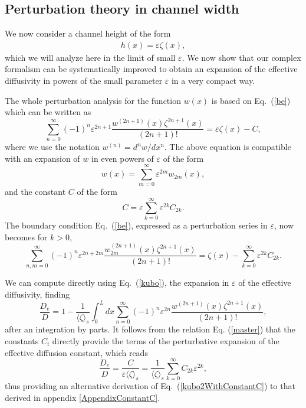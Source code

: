 \documentclass[pre,showpacs,preprintnumbers,amsmath,amssymb,superscriptaddress]{revtex4-1}
\begin{document}
{{\subsection{Perturbation theory in channel width}\label{pert}

We now consider a channel height of the form 
\begin{align}
h(x) = \varepsilon\zeta(x), 
\end{align}
which we will analyze here in the limit of small $\varepsilon$.
We now show that our complex formalism can be systematically improved to obtain an expansion of the effective diffusivity in powers of the small parameter $\varepsilon$ in a very compact way.
 
The whole perturbation analysis for the function $w(x)$ is based on Eq.~(\ref{be}) which can be written as
\begin{equation}
\sum_{n=0}^\infty(-1)^n\varepsilon^{2n+1}\frac{ w^{(2n+1)}(x) \zeta^{2n+1} (x)}{(2n+1)!} = {\varepsilon \zeta(x)-C},\label{master}
\end{equation} 
where we use the notation $w^{(n)} = d^n w /dx^n$. The above equation is compatible with an expansion of $w$ in even powers of $\varepsilon$ of the form
\begin{equation}
w(x) = \sum_{m=0}^\infty \varepsilon^{2m}w_{2m}(x),
\end{equation}
and the constant $C$ of the form
\begin{equation}
C= \varepsilon \sum_{k=0}^\infty \varepsilon^{2k}C_{2k} .
\end{equation}
The boundary condition Eq.~(\ref{be}), expressed as a perturbation series in $\varepsilon$, now becomes for $k>0$,
\begin{equation}
\sum_{n,m=0}^\infty(-1)^n\varepsilon^{2n+2m}\frac{ w_{2m}^{(2n+1)}(x) \zeta^{2n+1} (x)}{(2n+1)!} = { \zeta(x)-\sum_{k=0}^\infty \varepsilon^{2k}C_{2k} }.\label{perta}
\end{equation}

We can compute directly using  Eq.~(\ref{kubo}), the expansion in $\varepsilon$ of the effective diffusivity, finding
\begin{equation}
\frac{D_e}{D} =1 - \frac{1}{\langle \zeta\rangle_s}\int_0^L d{x} \sum_{n=0}^\infty (-1)^n \varepsilon^{2n}\frac{w^{(2n+1)}(x)\zeta^{2n+1}(x)}{(2n+1)!},
\end{equation}
after an integration by parts. It follows from the relation Eq. (\ref{master}) that the constants $C_i$ directly provide the terms of the perturbative expansion of the effective diffusion constant, which reads
\begin{equation}
\frac{D_e}{D} =\frac{C}{\varepsilon\langle \zeta\rangle_s} = \frac{1}{\langle \zeta\rangle_s} \sum_{k=0}^\infty C_{2k} \varepsilon^{2k} \label{De},
\end{equation}
thus providing an alternative derivation of Eq.~(\ref{kubo2WithConstantC}) to that derived in appendix \ref{AppendixConstantC}.

}}
\end{document}

